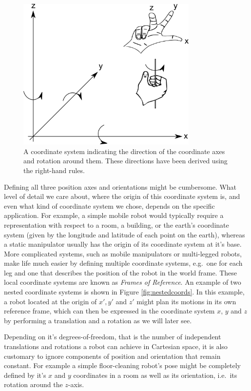 \begin{figure}
	\centering
		\includegraphics[width=0.8\textwidth]{figs/coordinatesystem}
	\caption{A coordinate system indicating the direction of the coordinate axes and rotation around them. These directions have been derived using the right-hand rules.}
	\label{fig:coordinatesystem}
\end{figure}

Defining all three position axes and orientations might be cumbersome. What level of detail we care about, where the origin of this coordinate system is, and even what kind of coordinate system we chose, depends on the specific application. For example, a simple mobile robot would typically require a representation with respect to a room, a building, or the earth's coordinate system (given by the longitude and latitude of each point on the earth), whereas a static manipulator usually has the origin of its coordinate system at it's base. More complicated systems, such as mobile manipulators or multi-legged robots, make life much easier by defining multiple coordinate systems, e.g.\ one for each leg and one that describes the position of the robot in the world frame. These local coordinate systems are known as \emph{Frames of Reference}. 
An example of two nested coordinate systems is shown in Figure \ref{fig:nestedcoords}. In this example, a robot located at the origin of $x',y'$ and $z'$ might plan its motions in its own reference frame, which can then be expressed in the coordinate system $x$, $y$ and $z$ by performing a translation and a rotation as we will later see. 

Depending on it's degrees-of-freedom, that is the number of independent translations and rotations a robot can achieve in Cartesian space, it is also customary to ignore components of position and orientation that remain constant. For example a simple floor-cleaning robot's pose might be completely defined by it's $x$ and $y$ coordinates in a room as well as its orientation, i.e.\ its rotation around the $z$-axis. 


